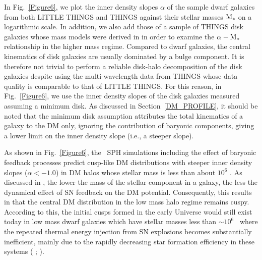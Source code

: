 \documentclass[natbib209]{emulateapj}
\begin{document}
In Fig.~\ref{Figure6}, we plot the inner density slopes $\alpha$ of the sample dwarf galaxies
from both LITTLE THINGS and THINGS against their stellar masses $\rm M_{*}$ on a
logarithmic scale. In addition, we also add those of a sample of THINGS disk
galaxies whose mass models were derived in \cite{deBlok_2008} in order to
examine the $\alpha \-- \rm M_{*}$ relationship in the higher mass regime. Compared to dwarf
galaxies, the central kinematics of disk galaxies are usually dominated by
a bulge component. It is therefore not trivial to perform a reliable disk-halo
decomposition of the disk galaxies despite using the multi-wavelength data from
THINGS whose data quality is comparable to that of LITTLE THINGS. For this
reason, in Fig.~\ref{Figure6}, we use the inner density slopes of
the disk galaxies measured assuming a minimum disk. As discussed in
Section~\ref{DM_PROFILE}, it should be noted that the minimum disk assumption attributes the total
kinematics of a galaxy to the DM only, ignoring the contribution of baryonic
components, giving a lower limit on the inner density slope (i.e., a steeper slope). 

As shown in Fig.~\ref{Figure6}, the \LCDM\ SPH simulations including the effect
of baryonic feedback processes predict cusp-like DM distributions with steeper inner density
slopes ($\alpha < -1.0$) in DM halos whose stellar mass is less
than about $10^6$ \Msun. As discussed in \cite{Governato_2012}, the lower the
mass of the stellar component in a galaxy, the less the dynamical effect of SN feedback on
the DM potential. Consequently, this results in that the central DM
distribution in the low mass halo regime remains cuspy. According to this,
the initial cusps formed in the early Universe would still exist today in low mass dwarf
galaxies which have stellar masses less than $\sim10^6$ \Msun\ where the repeated thermal
energy injection from SN explosions becomes substantially inefficient, mainly
due to the rapidly decreasing star formation efficiency in these systems
(\citeauthor{Governato_2012} \citeyear{Governato_2012};
\citeauthor{Pontzen_2012} \citeyear{Pontzen_2012}).
\end{document}
